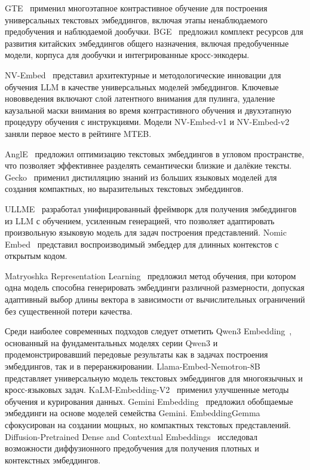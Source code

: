 GTE~\cite{2308.03281} применил многоэтапное контрастивное обучение для построения универсальных текстовых эмбеддингов, включая этапы ненаблюдаемого предобучения и наблюдаемой дообучки. BGE~\cite{2309.07597} предложил комплект ресурсов для развития китайских эмбеддингов общего назначения, включая предобученные модели, корпуса для дообучки и интегрированные кросс-энкодеры.

NV-Embed~\cite{2405.17428} представил архитектурные и методологические инновации для обучения LLM в качестве универсальных моделей эмбеддингов. Ключевые нововведения включают слой латентного внимания для пулинга, удаление каузальной маски внимания во время контрастивного обучения и двухэтапную процедуру обучения с инструкциями. Модели NV-Embed-v1 и NV-Embed-v2 заняли первое место в рейтинге MTEB.

AnglE~\cite{2309.12871} предложил оптимизацию текстовых эмбеддингов в угловом пространстве, что позволяет эффективнее разделять семантически близкие и далёкие тексты. Gecko~\cite{2403.20327} применил дистилляцию знаний из больших языковых моделей для создания компактных, но выразительных текстовых эмбеддингов.

ULLME~\cite{2408.03402} разработал унифицированный фреймворк для получения эмбеддингов из LLM с обучением, усиленным генерацией, что позволяет адаптировать произвольную языковую модель для задач построения представлений. Nomic Embed~\cite{2402.01613} представил воспроизводимый эмбеддер для длинных контекстов с открытым кодом.

Matryoshka Representation Learning~\cite{2205.13147} предложил метод обучения, при котором одна модель способна генерировать эмбеддинги различной размерности, допуская адаптивный выбор длины вектора в зависимости от вычислительных ограничений без существенной потери качества.

Среди наиболее современных подходов следует отметить Qwen3 Embedding~\cite{2506.05176}, основанный на фундаментальных моделях серии Qwen3 и продемонстрировавший передовые результаты как в задачах построения эмбеддингов, так и в переранжировании. Llama-Embed-Nemotron-8B~\cite{2511.07025} представляет универсальную модель текстовых эмбеддингов для многоязычных и кросс-языковых задач. KaLM-Embedding-V2~\cite{2506.20923} применил улучшенные методы обучения и курирования данных. Gemini Embedding~\cite{2503.07891} предложил обобщаемые эмбеддинги на основе моделей семейства Gemini. EmbeddingGemma~\cite{2509.20354} сфокусирован на создании мощных, но компактных текстовых представлений. Diffusion-Pretrained Dense and Contextual Embeddings~\cite{2602.11151} исследовал возможности диффузионного предобучения для получения плотных и контекстных эмбеддингов.

